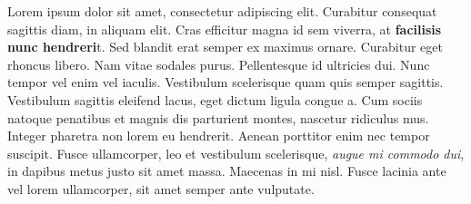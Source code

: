 \documentclass{book}
\begin{document}
Lorem ipsum dolor sit amet, consectetur adipiscing elit. Curabitur consequat sagittis diam, in aliquam elit. Cras efficitur magna id sem viverra, at {\bf facilisis nunc hendreri}t. Sed blandit erat semper ex maximus ornare. Curabitur eget rhoncus libero. Nam vitae sodales purus. Pellentesque id ultricies dui. Nunc tempor vel enim vel iaculis. Vestibulum scelerisque quam quis semper sagittis. Vestibulum sagittis eleifend lacus, eget dictum ligula congue a. Cum sociis natoque penatibus et magnis dis parturient montes, nascetur ridiculus mus. Integer pharetra non lorem eu hendrerit. Aenean porttitor enim nec tempor suscipit. Fusce ullamcorper, leo et vestibulum scelerisque, \emph{augue mi commodo dui}, in dapibus metus justo sit amet massa. Maecenas in mi nisl. Fusce lacinia ante vel lorem ullamcorper, sit amet semper ante vulputate.
\end{document}
